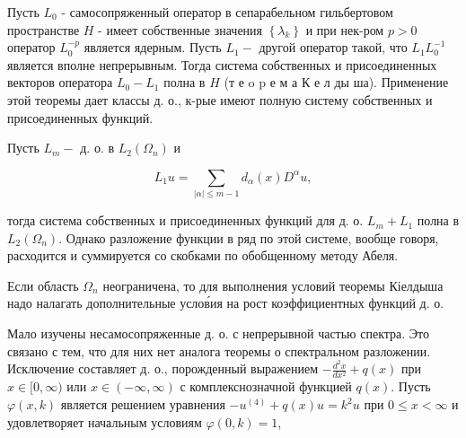 \documentclass[10pt]{article}
\begin{document}
Пусть $L_{0}$ - самосопряженный оператор в сепарабельном гильбертовом пространстве $H$ - имеет собственные значения $\left\{\lambda_{k}\right\}$ и при нек-ром $p>0$ оператор $L_{0}^{-p}$ является ядерным. Пусть $L_{1}-$ другой оператор такой, что $L_{1} L_{0}^{-1}$ является вполне непрерывным. Тогда система собственных и присоединенных векторов оператора $L_{0}-L_{1}$ полна в $H$ (т е o p е м а $К$ е л ды ша). Применение этой теоремы дает классы д. о., к-рые имеют полную систему собственных и присоединенных функций.



Пусть $L_{m}-$ д. о. в $L_{2}\left(\Omega_{n}\right)$ и



\[

L_{1} u=\sum_{|\alpha| \leqslant m-1} d_{\alpha}(x) D^{\alpha} u,

\]



тогда система собственных и присоединенных функций для д. о. $L_{m}+L_{1}$ полна в $L_{2}\left(\Omega_{n}\right)$. Однако разложение функции в ряд по этой системе, вообще говоря, расходится и суммируется со скобками по обобщенному методу Абеля.



Если область $\Omega_{n}$ неограничена, то для выполнения условий теоремы Кіелдыша надо налагать дополнительные услов́ия на рост коэффициентных функций д. $о$.



Мало изучены несамосопряженные д. о. с непрерывной частью спектра. Это связано с тем, что для них нет аналога теоремы о спектральном разложении. Исключение составляет д. о., порожденный выражением $-\frac{d^{2} x}{d x^{2}}+q(x)$ при $x \in[0, \infty)$ или $x \in(-\infty, \infty)$ с комплекснозначной функцией $q(x)$. Пусть $\varphi(x, k)$ является решением уравнения $-u^{(4)}+q(x) u=k^{2} u$ при $0 \leqslant x<\infty$ и удовлетворяет начальным условиям $\varphi(0, k)=1$,
\end{document}
